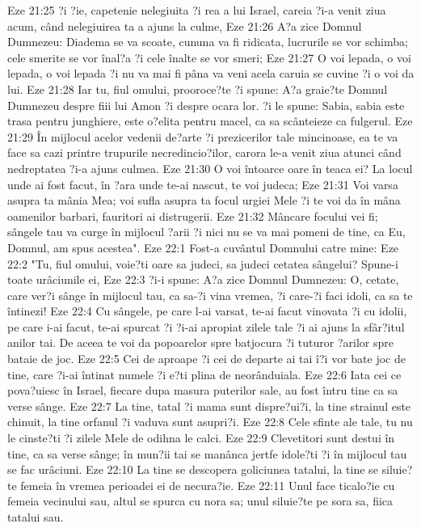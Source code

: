 Eze 21:25  ?i ?ie, capetenie nelegiuita ?i rea a lui Israel, careia ?i-a venit ziua acum, când nelegiuirea ta a ajuns la culme,
Eze 21:26  A?a zice Domnul Dumnezeu: Diadema se va scoate, cununa va fi ridicata, lucrurile se vor schimba; cele smerite se vor înal?a ?i cele înalte se vor smeri;
Eze 21:27  O voi lepada, o voi lepada, o voi lepada ?i nu va mai fi pâna va veni acela caruia se cuvine ?i o voi da lui.
Eze 21:28  Iar tu, fiul omului, prooroce?te ?i spune: A?a graie?te Domnul Dumnezeu despre fiii lui Amon ?i despre ocara lor. ?i le spune: Sabia, sabia este trasa pentru junghiere, este o?elita pentru macel, ca sa scânteieze ca fulgerul.
Eze 21:29  În mijlocul acelor vedenii de?arte ?i prezicerilor tale mincinoase, ea te va face sa cazi printre trupurile necredincio?ilor, carora le-a venit ziua atunci când nedreptatea ?i-a ajuns culmea.
Eze 21:30  O voi întoarce oare în teaca ei? La locul unde ai fost facut, în ?ara unde te-ai nascut, te voi judeca;
Eze 21:31  Voi varsa asupra ta mânia Mea; voi sufla asupra ta focul urgiei Mele ?i te voi da în mâna oamenilor barbari, fauritori ai distrugerii.
Eze 21:32  Mâncare focului vei fi; sângele tau va curge în mijlocul ?arii ?i nici nu se va mai pomeni de tine, ca Eu, Domnul, am spus acestea".
Eze 22:1  Fost-a cuvântul Domnului catre mine:
Eze 22:2  "Tu, fiul omului, voie?ti oare sa judeci, sa judeci cetatea sângelui? Spune-i toate urâciunile ei,
Eze 22:3  ?i-i spune: A?a zice Domnul Dumnezeu: O, cetate, care ver?i sânge în mijlocul tau, ca sa-?i vina vremea, ?i care-?i faci idoli, ca sa te întinezi!
Eze 22:4  Cu sângele, pe care l-ai varsat, te-ai facut vinovata ?i cu idolii, pe care i-ai facut, te-ai spurcat ?i ?i-ai apropiat zilele tale ?i ai ajuns la sfâr?itul anilor tai. De aceea te voi da popoarelor spre batjocura ?i tuturor ?arilor spre bataie de joc.
Eze 22:5  Cei de aproape ?i cei de departe ai tai î?i vor bate joc de tine, care ?i-ai întinat numele ?i e?ti plina de neorânduiala.
Eze 22:6  Iata cei ce pova?uiesc în Israel, fiecare dupa masura puterilor sale, au fost întru tine ca sa verse sânge.
Eze 22:7  La tine, tatal ?i mama sunt dispre?ui?i, la tine strainul este chinuit, la tine orfanul ?i vaduva sunt asupri?i.
Eze 22:8  Cele sfinte ale tale, tu nu le cinste?ti ?i zilele Mele de odihna le calci.
Eze 22:9  Clevetitori sunt destui în tine, ca sa verse sânge; în mun?ii tai se manânca jertfe idole?ti ?i în mijlocul tau se fac urâciuni.
Eze 22:10  La tine se descopera goliciunea tatalui, la tine se siluie?te femeia în vremea perioadei ei de necura?ie.
Eze 22:11  Unul face ticalo?ie cu femeia vecinului sau, altul se spurca cu nora sa; unul siluie?te pe sora sa, fiica tatalui sau.
